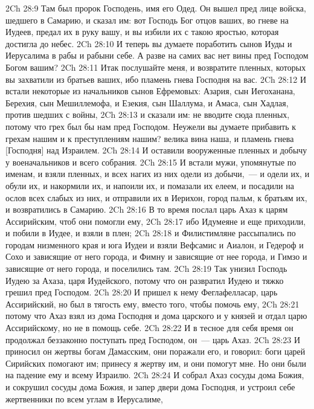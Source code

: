 \rsbpar\vs 2Ch 28:9 Там был пророк Господень, имя его Одед. Он вышел пред лице войска, шедшего в Самарию, и сказал им: вот Господь Бог отцов ваших, во гневе на Иудеев, предал их в руку вашу, и вы избили их с такою яростью, которая достигла до небес.
\vs 2Ch 28:10 И теперь вы думаете поработить сынов Иуды и Иерусалима в рабы и рабыни себе. А разве на самих вас нет вины пред Господом Богом вашим?
\vs 2Ch 28:11 Итак послушайте меня, и возвратите пленных, которых вы захватили из братьев ваших, ибо пламень гнева Господня на вас.
\vs 2Ch 28:12 И встали некоторые из начальников сынов Ефремовых: Азария, сын Иегоханана, Берехия, сын Мешиллемофа, и Езекия, сын Шаллума, и Амаса, сын Хадлая, против шедших с войны,
\vs 2Ch 28:13 и сказали им: не вводите сюда пленных, потому что грех был бы нам пред Господом. Неужели вы думаете прибавить к грехам нашим и к преступлениям нашим? велика вина наша, и пламень гнева [Господня] над Израилем.
\vs 2Ch 28:14 И оставили вооруженные пленных и добычу у военачальников и всего собрания.
\vs 2Ch 28:15 И встали мужи, упомянутые по именам, и взяли пленных, и всех нагих из них одели из добычи,~--- и одели их, и обули их, и накормили их, и напоили их, и помазали их елеем, и посадили на ослов всех слабых из них, и отправили их в Иерихон, город пальм, к братьям их, и возвратились в Самарию.
\rsbpar\vs 2Ch 28:16 В то время послал царь Ахаз к царям Ассирийским, чтоб они помогли ему,
\vs 2Ch 28:17 ибо Идумеяне и еще приходили, и  побили в Иудее, и взяли в плен;
\vs 2Ch 28:18 и Филистимляне рассыпались по городам низменного края и юга Иудеи и взяли Вефсамис и Аиалон, и Гедероф и Сохо и зависящие от него города, и Фимну и зависящие от нее города, и Гимзо и зависящие от него города, и поселились там.
\vs 2Ch 28:19 Так унизил Господь Иудею за Ахаза, царя Иудейского, потому что он развратил Иудею и тяжко грешил пред Господом.
\vs 2Ch 28:20 И пришел к нему Феглафелласар, царь Ассирийский, но был в тягость ему, вместо того, чтобы помочь ему,
\vs 2Ch 28:21 потому что Ахаз взял  из дома Господня и дома царского и у князей и отдал царю Ассирийскому, но не в помощь себе.
\rsbpar\vs 2Ch 28:22 И в тесное для себя время он продолжал беззаконно поступать пред Господом, он~--- царь Ахаз.
\vs 2Ch 28:23 И приносил он жертвы богам Дамасским,  они поражали его, и говорил: боги царей Сирийских помогают им; принесу я жертву им, и они помогут мне. Но они были на падение ему и всему Израилю.
\vs 2Ch 28:24 И собрал Ахаз сосуды дома Божия, и сокрушил сосуды дома Божия, и запер двери дома Господня, и устроил себе жертвенники по всем углам в Иерусалиме,
